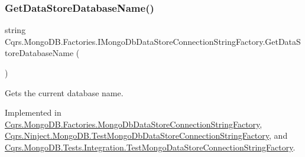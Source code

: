 \mbox{\label{interfaceCqrs_1_1MongoDB_1_1Factories_1_1IMongoDbDataStoreConnectionStringFactory_aca9921fae4214a9eb22a221825c57363_aca9921fae4214a9eb22a221825c57363}} 
\subsubsection{\texorpdfstring{Get\+Data\+Store\+Database\+Name()}{GetDataStoreDatabaseName()}}
{\footnotesize\ttfamily string Cqrs.\+Mongo\+D\+B.\+Factories.\+I\+Mongo\+Db\+Data\+Store\+Connection\+String\+Factory.\+Get\+Data\+Store\+Database\+Name (\begin{DoxyParamCaption}{ }\end{DoxyParamCaption})}



Gets the current database name. 



Implemented in \hyperlink{classCqrs_1_1MongoDB_1_1Factories_1_1MongoDbDataStoreConnectionStringFactory_ab8729212ac8fe8350dead56fc89a5fd2_ab8729212ac8fe8350dead56fc89a5fd2}{Cqrs.\+Mongo\+D\+B.\+Factories.\+Mongo\+Db\+Data\+Store\+Connection\+String\+Factory}, \hyperlink{classCqrs_1_1Ninject_1_1MongoDB_1_1TestMongoDbDataStoreConnectionStringFactory_a9ef0515d08d9a309fcfef00b15dad8cf_a9ef0515d08d9a309fcfef00b15dad8cf}{Cqrs.\+Ninject.\+Mongo\+D\+B.\+Test\+Mongo\+Db\+Data\+Store\+Connection\+String\+Factory}, and \hyperlink{classCqrs_1_1MongoDB_1_1Tests_1_1Integration_1_1TestMongoDataStoreConnectionStringFactory_a1f362a8cdae3f0fb7b8a51f62f7611f3_a1f362a8cdae3f0fb7b8a51f62f7611f3}{Cqrs.\+Mongo\+D\+B.\+Tests.\+Integration.\+Test\+Mongo\+Data\+Store\+Connection\+String\+Factory}.

